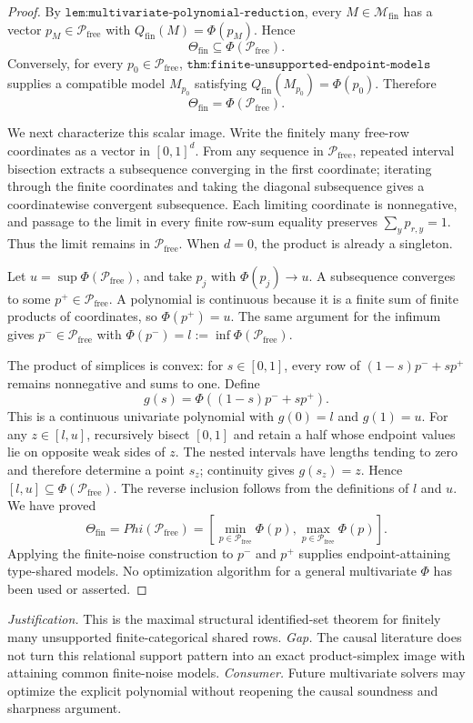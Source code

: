 \documentclass{article}
\begin{document}
\begin{proof}
By \(\texttt{lem:multivariate-polynomial-reduction}\), every \(M\in\mathcal M_{\mathrm{fin}}\) has a vector \(p_M\in\mathcal P_{\mathrm{free}}\) with \(Q_{\mathrm{fin}}(M)=\Phi(p_M)\).  Hence
\[
 \Theta_{\mathrm{fin}}\subseteq\Phi(\mathcal P_{\mathrm{free}}).
\]
Conversely, for every \(p_0\in\mathcal P_{\mathrm{free}}\), \(\texttt{thm:finite-unsupported-endpoint-models}\) supplies a compatible model \(M_{p_0}\) satisfying \(Q_{\mathrm{fin}}(M_{p_0})=\Phi(p_0)\).  Therefore
\[
 \Theta_{\mathrm{fin}}=\Phi(\mathcal P_{\mathrm{free}}).
\]

We next characterize this scalar image.  Write the finitely many free-row coordinates as a vector in \([0,1]^d\).  From any sequence in \(\mathcal P_{\mathrm{free}}\), repeated interval bisection extracts a subsequence converging in the first coordinate; iterating through the finite coordinates and taking the diagonal subsequence gives a coordinatewise convergent subsequence.  Each limiting coordinate is nonnegative, and passage to the limit in every finite row-sum equality preserves \(\sum_y p_{r,y}=1\).  Thus the limit remains in \(\mathcal P_{\mathrm{free}}\).  When \(d=0\), the product is already a singleton.

Let \(u=\sup\Phi(\mathcal P_{\mathrm{free}})\), and take \(p_j\) with \(\Phi(p_j)\to u\).  A subsequence converges to some \(p^+\in\mathcal P_{\mathrm{free}}\).  A polynomial is continuous because it is a finite sum of finite products of coordinates, so \(\Phi(p^+)=u\).  The same argument for the infimum gives \(p^-\in\mathcal P_{\mathrm{free}}\) with \(\Phi(p^-)=l:=\inf\Phi(\mathcal P_{\mathrm{free}})\).

The product of simplices is convex: for \(s\in[0,1]\), every row of \((1-s)p^-+sp^+\) remains nonnegative and sums to one.  Define
\[
 g(s)=\Phi((1-s)p^-+sp^+).
\]
This is a continuous univariate polynomial with \(g(0)=l\) and \(g(1)=u\).  For any \(z\in[l,u]\), recursively bisect \([0,1]\) and retain a half whose endpoint values lie on opposite weak sides of \(z\).  The nested intervals have lengths tending to zero and therefore determine a point \(s_z\); continuity gives \(g(s_z)=z\).  Hence \([l,u]\subseteq\Phi(\mathcal P_{\mathrm{free}})\).  The reverse inclusion follows from the definitions of \(l\) and \(u\).  We have proved
\[
 \Theta_{\mathrm{fin}}=Phi(\mathcal P_{\mathrm{free}})
 =\left[\min_{p\in\mathcal P_{\mathrm{free}}}\Phi(p),
         \max_{p\in\mathcal P_{\mathrm{free}}}\Phi(p)\right].
\]
Applying the finite-noise construction to \(p^-\) and \(p^+\) supplies endpoint-attaining type-shared models.  No optimization algorithm for a general multivariate \(\Phi\) has been used or asserted.
\end{proof}
\par\smallskip\noindent \textit{Justification.} This is the maximal structural identified-set theorem for finitely many unsupported finite-categorical shared rows. \textit{Gap.} The causal literature does not turn this relational support pattern into an exact product-simplex image with attaining common finite-noise models. \textit{Consumer.} Future multivariate solvers may optimize the explicit polynomial without reopening the causal soundness and sharpness argument.
\end{document}
